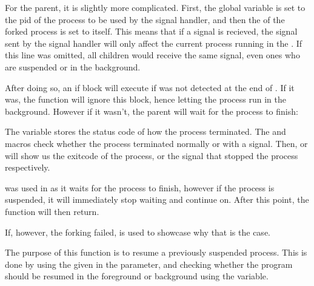 \documentclass[12pt, a4paper]{report}
\begin{document}
                For the parent, it is slightly more complicated.
                First, the  global variable is set to the pid
                of the process to be used by the signal handler, and then the 
                 of the forked process is set to itself. This means that
                if a signal is recieved, the signal sent by the signal handler
                will only affect the current process running in the .
                If this line was omitted, all children would receive the same signal,
                even ones who are suspended or in the background.

                After doing so, an if block will execute if \tx{\&} was not detected
                at the end of . If it was, the function will ignore this
                block, hence letting the process run in the background. However if it
                wasn't, the parent will wait for the process to finish:

                \begingroup
                    \fontsize{10pt}{10pt}\selectfont
                \endgroup

                The  variable stores the status code of how the process
                terminated. The  and  macros check
                whether the process terminated normally or with a signal. Then, 
                 or  will show us 
                the exitcode of the process, or the signal that stopped the process
                respectively.

                 was used in  as it waits for the process
                to finish, however if the process is suspended, it will immediately
                stop waiting and continue on. After this point, the function will then
                return.

                If, however, the forking failed,  is used to showcase why
                that is the case.

                \clearpage

                The purpose of this function is to resume a previously suspended 
                process. This is done by using the  given in the parameter,
                and checking whether the program should be resumed in the foreground
                or background using the  variable.
\end{document}
